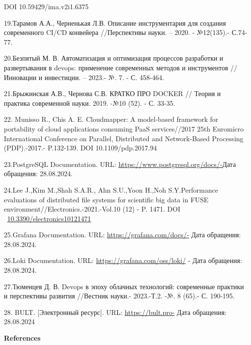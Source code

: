 \begin{references}
DOI 10.59429/ima.v2i1.6375

19.Тарамов А.А., Черненькая Л.В. Описание инструментария для создания
современного CI/CD конвейера //Перспективы науки. -- 2020. - №12(135).-
С.74-77.

20.Безпятый М. В. Автоматизация и оптимизация процессов разработки и
развертывания в devops: применение современных методов и инструментов
//Инновации и инвестиции. -- 2023.- №. 7. - С. 458-464.

21.Брыжинская А.В., Чернова С.В. КРАТКО ПРО DOCKER // Теория и практика
современной науки. 2019. -№10 (52). - С. 33-35.

22. Munisso R., Chis A. E. Cloudmapper: A model-based framework for
portability of cloud applications consuming PaaS services//2017 25th
Euromicro International Conference on Parallel, Distributed and
Network-Based Processing (PDP).-2017.- P.132-139. DOI
10.1109/pdp.2017.94

23.PostgreSQL Documentation. URL:
\url{https://www.postgresql.org/docs/-}Дата обращения: 28.08.2024.

24.Lee J.,Kim M.,Shah S.A.R., Ahn S.U.,Yoon H.,Noh S.Y.Performance
evaluations of distributed file systems for scientific big data in FUSE
environment//Electronics.-2021.-Vol.10 (12) - P. 1471. DOI
~\href{https://doi.org/10.3390/electronics10121471}{10.3390/electronics10121471}

25.Grafana Documentation. URL: \url{https://grafana.com/docs/-} Дата
обращения: 28.08.2024.

26.Loki Documentation. URL: \url{https://grafana.com/oss/loki/} - Дата
обращения: 28.08.2024.

27.Тюменцев Д. В. Devops в эпоху облачных технологий: современные
практики и перспективы развития //Вестник науки.- 2023.-Т.2. -№. 8
(65).- С. 190-195.

28. BULT. {[}Электронный ресурс{]}. URL: \url{https://bult.pro-} Дата
обращения: 28.08.2024
\end{references}

\begin{center}
{\bfseries References}
\end{center}

